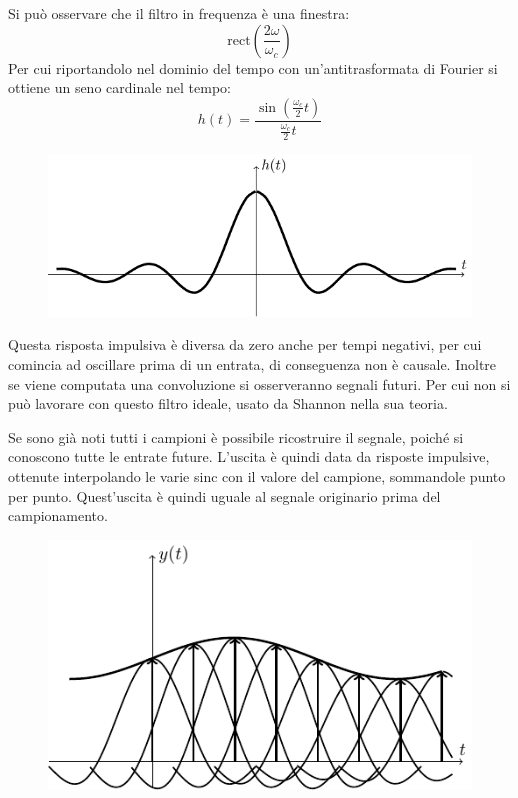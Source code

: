 \documentclass{article}
\numberwithin{equation}{subsection}
\begin{document}
Si può osservare che il filtro in frequenza è una finestra:
\begin{equation*}
    \mathrm{rect}\left(\displaystyle\frac{2\omega}{\omega_c}\right)
\end{equation*}    
Per cui riportandolo nel dominio del tempo con un'antitrasformata di Fourier si ottiene un seno cardinale nel tempo: 
\begin{equation*}
    h(t)=\displaystyle\frac{\sin\left(\displaystyle\frac{\omega_c}{2}t\right)}{\displaystyle\frac{\omega_c}{2}t}
\end{equation*}
\begin{figure}[H]%
    \centering
    \includegraphics{sinc.pdf}%
\end{figure}

Questa risposta impulsiva è diversa da zero anche per tempi negativi, per cui comincia ad oscillare prima di un entrata, di conseguenza non è causale. Inoltre 
se viene computata una convoluzione si osserveranno segnali futuri. Per cui non si può lavorare con questo filtro ideale, usato da Shannon nella sua teoria. 

Se sono già 
noti tutti i campioni è possibile ricostruire il segnale, poiché si conoscono tutte le entrate future. L'uscita è quindi data da risposte impulsive, ottenute interpolando 
le varie sinc con il valore del campione, sommandole punto per punto. Quest'uscita è quindi uguale al segnale originario prima del campionamento. 

\begin{figure}[H]%
    \centering
    \includegraphics{ricostruzione.pdf}%
\end{figure}
\end{document}
